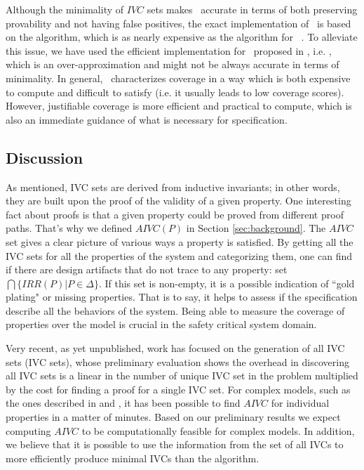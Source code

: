 Although the minimality of $IVC$ sets makes \ivccov\ accurate
in terms of both preserving provability and not having false positives, the exact implementation of \ivccov\ is based on the \ucbfalg algorithm, which is as nearly expensive as the \mustalg algorithm for \nondetcov\ . To alleviate this issue, we have used the efficient implementation for \ivccov\ proposed in \cite{Ghass16}, i.e. \ucalg,
 which is an over-approximation and might not be always accurate in terms of minimality. In general, \nondetcov\ characterizes coverage in a way which is both expensive to compute and difficult to satisfy (i.e. it usually leads to low coverage scores). However, justifiable coverage is more efficient and practical to compute, which is also an immediate guidance of what is necessary for specification.

\subsection{Discussion}
As mentioned, IVC sets are derived from inductive invariants; in other words, they are built upon the proof of the validity of a given property. One interesting fact about proofs
  is that a given property could be proved from different proof paths. That's why we defined $AIVC(P)$ in Section \ref{sec:background}. The $AIVC$ set gives a clear picture of various ways a property is satisfied. By getting all the IVC sets for all the properties of the system and categorizing them, one can find if there are design artifacts that do not trace to any property: set $\bigcap \{IRR (P) | P \in \Delta \}$.  If this set is non-empty, it is a possible indication of ``gold plating" or missing properties. That is to say, it helps to assess if the specification describe all the behaviors of the system. Being able to measure the coverage of properties over the model is crucial in the safety critical system domain.

Very recent, as yet unpublished, work has focused on the
generation of all IVC sets (IVC sets), whose preliminary evaluation
shows the overhead in discovering all IVC sets is a linear in the
number of unique IVC set in the problem multiplied by the cost
for finding a proof for a single IVC set. For complex models, such
as the ones described in \cite {QFCS15:backes} and \cite{hilt2013}, it has been possible to
find $AIVC$ for individual properties in a matter of minutes.
Based on our preliminary results we expect computing $AIVC$ to be computationally feasible for complex models. In
addition, we believe that it is possible to use the information
from the set of all IVCs to more efficiently produce minimal
IVCs than the \ucbfalg algorithm. 